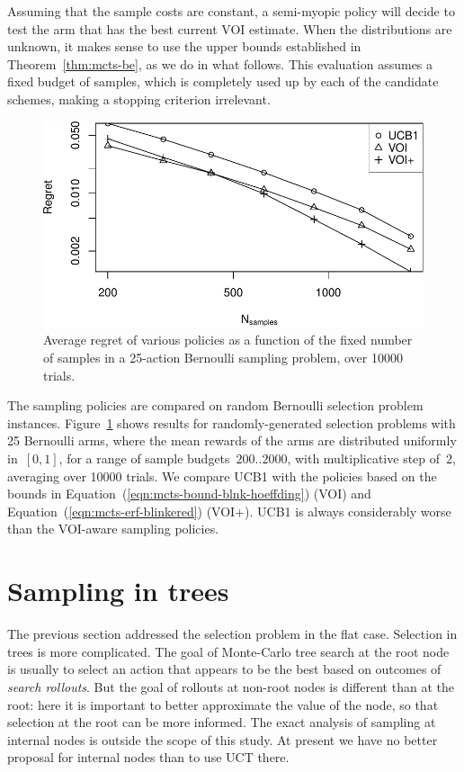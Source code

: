 Assuming that the sample costs are constant,
a semi-myopic policy will decide to test the arm that has the best
current VOI estimate. 
When the distributions are unknown, it makes sense
to use the upper bounds established in Theorem~\ref{thm:mcts-be}, as
we do in what follows. This evaluation assumes a fixed budget of samples, which is
completely used up by each of the candidate schemes, making a stopping
criterion irrelevant.

\begin{figure}[h!]
\centering
\includegraphics[scale=0.55]{mcts-flat.pdf}
\caption{Average regret of various policies as a function of the fixed number 
of samples in a 25-action Bernoulli sampling problem, over 10000 trials.}
\label{fig:random-instances}
\end{figure}

The sampling policies are compared on random Bernoulli
selection problem instances. Figure~\ref{fig:random-instances} shows results for
randomly-generated selection problems with 25 Bernoulli arms, where
the mean rewards of the arms are distributed uniformly in~$[0,1]$, 
for a range of sample budgets~$200..2000$, with multiplicative
step of~$2$, averaging over 10000 trials.  We compare UCB1 with the 
policies based on the bounds in
Equation~(\ref{eqn:mcts-bound-blnk-hoeffding}) (VOI) and
Equation~(\ref{eqn:mcts-erf-blinkered}) (VOI+).
UCB1 is always considerably worse than the VOI-aware sampling policies.


\section{Sampling in trees}
\label{sec:mcts-sampling-in-trees}

The previous section addressed the selection problem in the flat case.
Selection in trees is more complicated.  The goal of Monte-Carlo tree 
search \cite{Chaslot.montecarlo} at the root node 
is usually to select an action that appears to be the best based on outcomes
of \textit{search rollouts}.
But the goal of rollouts at non-root nodes
is different than at the root: here it is important to better approximate the
value of the node, so that selection at the root can be more informed. The exact analysis
of sampling at internal nodes is outside the scope of this study. At present we 
have no better proposal for internal nodes than to use UCT there.

